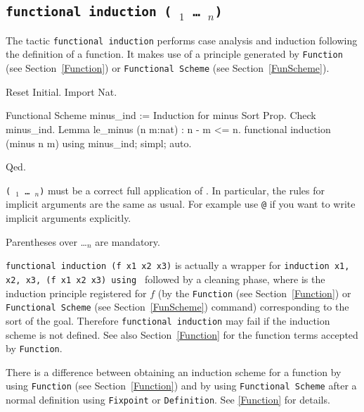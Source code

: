 \begin{coq_example*}
\subsection{\tt functional induction (\qualid\ \term$_1$ \dots\ \term$_n$)}
\label{FunInduction}

The tactic \texttt{functional induction} performs
case analysis and induction following the definition of a function. It
makes use of a principle generated by \texttt{Function}
(see Section~\ref{Function}) or \texttt{Functional Scheme}
(see Section~\ref{FunScheme}).

\begin{coq_eval}
Reset Initial.
Import Nat.
\end{coq_eval}
\begin{coq_example}
Functional Scheme minus_ind := Induction for minus Sort Prop.
Check minus_ind.
Lemma le_minus (n m:nat) : n - m <= n.
functional induction (minus n m) using minus_ind; simpl; auto.
\end{coq_example}
\begin{coq_example*}
Qed.
\end{coq_example*}

\Rem \texttt{(\qualid\ \term$_1$ \dots\ \term$_n$)} must be a correct
full application of \qualid. In particular, the rules for implicit
arguments are the same as usual. For example use \texttt{@\qualid} if
you want to write implicit arguments explicitly.

\Rem Parentheses over \qualid \dots \term$_n$ are mandatory.

\Rem \texttt{functional induction (f x1 x2 x3)} is actually a wrapper
for \texttt{induction x1, x2, x3, (f x1 x2 x3) using \qualid} followed by
a cleaning phase, where {\qualid} is the induction principle
registered for $f$ (by the \texttt{Function} (see Section~\ref{Function})
or \texttt{Functional Scheme} (see Section~\ref{FunScheme}) command)
corresponding to the sort of the goal.  Therefore \texttt{functional
  induction} may fail if the induction scheme {\qualid} is
not defined. See also Section~\ref{Function} for the function terms
accepted by \texttt{Function}.

\Rem There is a difference between obtaining an induction scheme for a
function by using \texttt{Function} (see Section~\ref{Function}) and by
using \texttt{Functional Scheme} after a normal definition using
\texttt{Fixpoint} or \texttt{Definition}. See \ref{Function} for
details.

\SeeAlso{\ref{Function},\ref{FunScheme},\ref{FunScheme-examples},
  \ref{sec:functional-inversion}}


\end{coq_example*}
